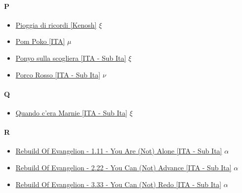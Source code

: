 		\paragraph{P} \hypertarget{FP}{}
			\begin{itemize}
			
			\item \href{https://mega.nz/#!2sxyWD6A!XIGT7uc6CGg2zVgKGZA93emvArHls9Ts9LcEjKN01rE} {Pioggia di ricordi [Kenosh]} $\xi$   \\
			\item \href{https://mega.nz/#F!1xxXkRTR!ctcNSCo4_DrW99L26Aiaig} {Pom Poko [ITA]} $\mu$   \\
			\item \href{https://mega.nz/#!b4YwXRAQ!9ABa4OnfVu-Sv7HpWeKQG7KU7b7g6SJGNLc6WfljJaw} {Ponyo sulla scogliera [ITA - Sub Ita]} $\xi$   \\
			\item \href{https://mega.nz/#!K4MTHSiL!b9pMMSahTNUXiYduGw_l3uOYoBjak5MSpE8WHpmYmHg} {Porco Rosso [ITA - Sub Ita]} $\nu$ \\
						
		\end{itemize}	
	
		\paragraph{Q} \hypertarget{FQ}{}
			\begin{itemize}
		
				\item \href{https://mega.nz/#!CtpzDD7Y!X3PBHceyA19jpv4VGHuvWHiive1aeK6QeaWTU3e6PZs} {Quando c'era Marnie [ITA - Sub Ita]} $\xi$   \\
						
			\end{itemize}
			
		\paragraph{R} \hypertarget{FR}{}
			\begin{itemize}
				
				\item \href{https://mega.nz/#!oEkmALiY!Bum4nqxaNoo37B4sZvlsowaChztOioRCZJPYnFhsr6U} {Rebuild Of Evangelion - 1.11 - You Are (Not) Alone [ITA - Sub Ita]} $\alpha$   \\
				\item \href{https://mega.nz/#!VAdESBKY!_dt0qfK8iHoJnrOFtBXWYZ96zqWz99Hc7frSajzAjkc} {Rebuild Of Evangelion - 2.22 - You Can (Not) Advance [ITA - Sub Ita]} $\alpha$   \\
				\item \href{https://mega.nz/#!AdFGDTKT!d6y7h8EIRjKQVJ3Ey8RNlmUL7SGBFgwm7kFEmpH_TwY} {Rebuild Of Evangelion - 3.33 - You Can (Not) Redo [ITA - Sub Ita]} $\alpha$   \\
				
			\end{itemize}
		
